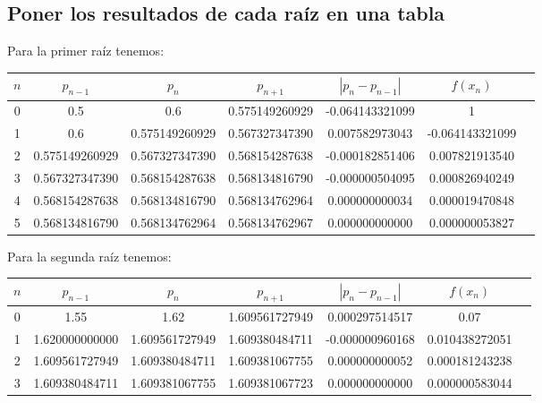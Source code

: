 \documentclass{article}
\begin{document}
\subsection{Poner los resultados de cada raíz en una tabla}
Para la primer raíz tenemos: 

\begin{center}
    \begin{tabular}{||c c c c c c c||} 
    \hline
    $n$ & $p_{n-1}$ & $p_{n}$  & $p_{n+1}$ & $|p_n - p_{n-1}|$ & $f(x_n)$\\ [0.5ex] 
    \hline\hline
    0 & 0.5 & 0.6 & 0.575149260929 & -0.064143321099 & 1 \\ 
    \hline
    1 & 0.6 & 0.575149260929  & 0.567327347390 & 0.007582973043 & -0.064143321099 \\
    \hline
    2 & 0.575149260929 & 0.567327347390 & 0.568154287638 & -0.000182851406 & 0.007821913540\\
    \hline
    3 & 0.567327347390 & 0.568154287638 & 0.568134816790 & -0.000000504095 & 0.000826940249\\
    \hline
    4 & 0.568154287638 & 0.568134816790 & 0.568134762964 & 0.000000000034 & 0.000019470848\\
    \hline 
    5 & 0.568134816790 & 0.568134762964 & 0.568134762967 & 0.000000000000 & 0.000000053827\\ [1ex]
    \hline

   \end{tabular}
\end{center}


Para la segunda raíz tenemos: 

\begin{center}
    \begin{tabular}{||c c c c c c c||} 
    \hline
    $n$ & $p_{n-1}$ & $p_{n}$  & $p_{n+1}$ & $|p_n - p_{n-1}|$ & $f(x_n)$\\ [0.5ex] 
    \hline\hline
    0 & 1.55 & 1.62 & 1.609561727949 &  0.000297514517 & 0.07 \\ 
    \hline
    1 & 1.620000000000 & 1.609561727949  & 1.609380484711 & -0.000000960168 & 0.010438272051 \\
    \hline
    2 & 1.609561727949 & 1.609380484711 & 1.609381067755 & 0.000000000052 & 0.000181243238\\
    \hline
    3 & 1.609380484711 & 1.609381067755 & 1.609381067723 & 0.000000000000 & 0.000000583044\\ [1ex]
    \hline

   \end{tabular}
\end{center}
\end{document}

